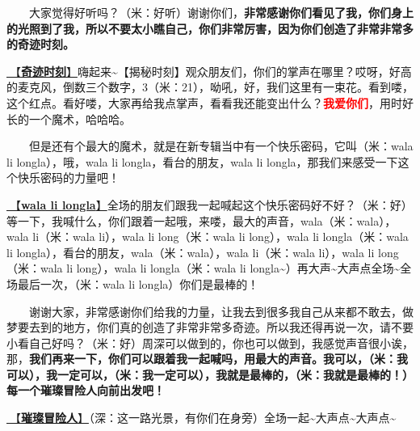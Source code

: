 \documentclass[]{ctexbook}
\begin{document}
  大家觉得好听吗？（米：好听）谢谢你们，\textbf{非常感谢你们看见了我，你们身上的光照到了我，所以不要太小瞧自己，你们非常厉害，因为你们创造了非常非常多的奇迹时刻。}

\hyperref[magic-moment]{🎵【\textbf{奇迹时刻}】}嗨起来\textasciitilde【揭秘时刻】观众朋友们，你们的掌声在哪里？哎呀，好高的麦克风，倒数三个数字，3（米：21），呦吼，好，我们这里有一束花。看到喽，这个红点。看好喽，大家再给我点掌声，看看我还能变出什么？\textbf{\textcolor{red}{我爱你们}}，用时好长的一个魔术，哈哈哈。

  但是还有个最大的魔术，就是在新专辑当中有一个快乐密码，它叫（米：wala li longla），哦，wala li longla，看台的朋友，wala li longla，那我们来感受一下这个快乐密码的力量吧！

\hyperref[wala-li-longla]{🎵【\textbf{wala li longla}】}全场的朋友们跟我一起喊起这个快乐密码好不好？（米：好）等一下，我喊什么，你们跟着一起哦，来喽，最大的声音，wala（米：wala），wala li（米：wala li），wala li long（米：wala li long），wala li longla（米：wala li longla），看台的朋友，wala（米：wala），wala li（米：wala li），wala li long（米：wala li long），wala li longla（米：wala li longla\textasciitilde）再大声\textasciitilde 大声点全场\textasciitilde 全场最后一次，（米：wala li longla）你们是最棒的！

  谢谢大家，非常感谢你们给我的力量，让我去到很多我自己从来都不敢去，做梦要去到的地方，你们真的创造了非常非常多奇迹。所以我还得再说一次，请不要小看自己好吗？（米：好）周深可以做到的，你也可以做到，我感觉声音很小诶，那，\textbf{我们再来一下，你们可以跟着我一起喊吗，用最大的声音。我可以，（米：我可以），我一定可以，（米：我一定可以），我就是最棒的，（米：我就是最棒的！）每一个璀璨冒险人向前出发吧！}

\hyperref[adventurers]{🎵【\textbf{璀璨冒险人}】}（深：这一路光景，有你们在身旁）全场一起\textasciitilde 大声点\textasciitilde 大声点\textasciitilde{}
\end{document}
